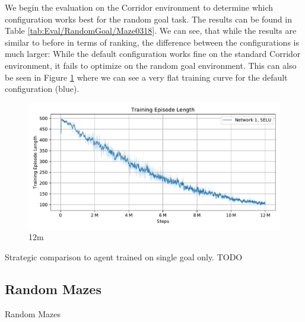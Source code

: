 We begin the evaluation on the Corridor environment to determine which configuration works best for the random goal task. The results can be found in Table \ref{tab:Eval/RandomGoal/Maze0318}. We can see, that while the results are similar to before in terms of ranking, the difference between the configurations is much larger: While the default configuration works fine on the standard Corridor environment, it fails to optimize on the random goal environment. This can also be seen in Figure \ref{fig:Eval/RandomGoal/Maze0318} where we can see a very flat training curve for the default configuration (blue). 

\begin{figure}[htp]
    \begin{center}
        \includegraphics[clip, width=0.95\columnwidth]{figures/evaluation/randomness/goals/maze0318_episode_length_final.pdf}
    \end{center}
    \caption[Episode Length for Different Agents on the Random Goal Corridor Environment]{12m} \label{fig:Eval/RandomGoal/Maze0318}
\end{figure}

Strategic comparison to agent trained on single goal only. TODO

\subsection{Random Mazes} \label{sec:EvalRandomMaze}
Random Mazes
